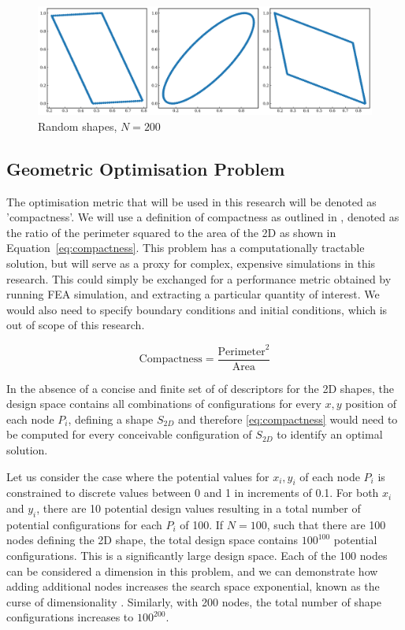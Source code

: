 \documentclass{article}
\begin{document}
\begin{figure}[htp]
    \centering
    \includegraphics[width=12cm]{figures/output.png}
    \caption{Random shapes, $N=200$}
    \label{fig:randomshapes}
\end{figure}


\subsection{Geometric Optimisation Problem}

The optimisation metric that will be used  in this research will be denoted as 'compactness'. We will use a definition of compactness as outlined in \citep{Bribiesca2008}, denoted as the ratio of the perimeter squared to the area of the 2D as shown in Equation~\eqref{eq:compactness}. This problem has a computationally tractable solution, but will serve as a proxy for complex, expensive simulations in this research. This could simply be exchanged for a performance metric obtained by running FEA simulation, and extracting a particular quantity of interest. We would also need to specify boundary conditions and initial conditions, which is out of scope of this research.

\begin{equation}
    \text{Compactness}=\frac{\text{Perimeter}^2}{\text{Area}}
    \label{eq:compactness}
\end{equation}

In the absence of a concise and finite set of of descriptors for the 2D shapes, the design space contains all combinations of configurations for every $x,y$ position of each node $P_i$, defining a shape $S_{2D}$ and therefore \eqref{eq:compactness} would need to be computed for every conceivable configuration of $S_{2D}$ to identify an optimal solution.

Let us consider the case where the potential values for $x_i,y_i$ of each node $P_i$ is constrained to discrete values between 0 and 1 in increments of 0.1. For both $x_i$ and $y_i$, there are 10 potential design values resulting in a total number of potential configurations for each $P_i$ of 100. If $N=100$, such that there are 100 nodes defining the 2D shape, the total design space contains $100^{100}$ potential configurations. This is a significantly large design space. Each of the 100 nodes can be considered a dimension in this problem, and we can demonstrate how adding additional nodes increases the search space exponential, known as the curse of dimensionality \citep{Keogh2017}. Similarly, with 200 nodes, the total number of shape configurations increases to $100^{200}$.
\end{document}
